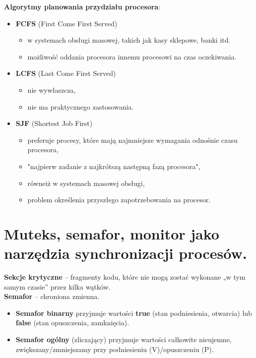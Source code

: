 \documentclass[main.tex]{subfiles}
\begin{document}
    \noindent \textbf{Algorytmy planowania przydziału procesora}:
    \begin{itemize}
        \item \textbf{FCFS} (First Come First Served)
        \begin{itemize}[noitemsep]
            \item w systemach obsługi masowej, takich jak kasy sklepowe, banki itd.
            \item możliwość oddania procesora innemu procesowi na czas oczekiwania.
        \end{itemize}

        \item \textbf{LCFS} (Last Come First Served)
        \begin{itemize}[noitemsep]
            \item nie wywłaszcza,
            \item nie ma praktycznego zastosowania.
        \end{itemize}

        \item \textbf{SJF} (Shortest Job First)
        \begin{itemize}
            \item preferuje procesy, które mają najmniejsze wymagania odnośnie czasu procesora,
            \item "najpierw zadanie z najkrótszą następną fazą procesora",
            \item równeiż w systemach masowej obsługi,
            \item problem określenia przyszłego zapotrzebowania na procesor.
        \end{itemize}
    \end{itemize}


    \section{Muteks, semafor, monitor jako narzędzia synchronizacji procesów.}
    \textbf{Sekcje krytyczne} -- fragmenty kodu, które nie mogą zostać wykonane „w tym samym czasie” przez kilka wątków.\\

    \noindent \textbf{Semafor} -- chroniona zmienna.
    \begin{itemize}
        \item \textbf{Semafor binarny} przyjmuje wartości \textbf{true} (stan podniesienia, otwarcia) lub
        \textbf{false} (stan opuszczenia, zamknięcia).
        \item \textbf{Semafor ogólny} (zliczający) przyjmuje wartości całkowite nieujemne, zwiększany/zmniejszamy
        przy podniesieniu (V)/opuszczeniu (P).
    \end{itemize}
\end{document}
